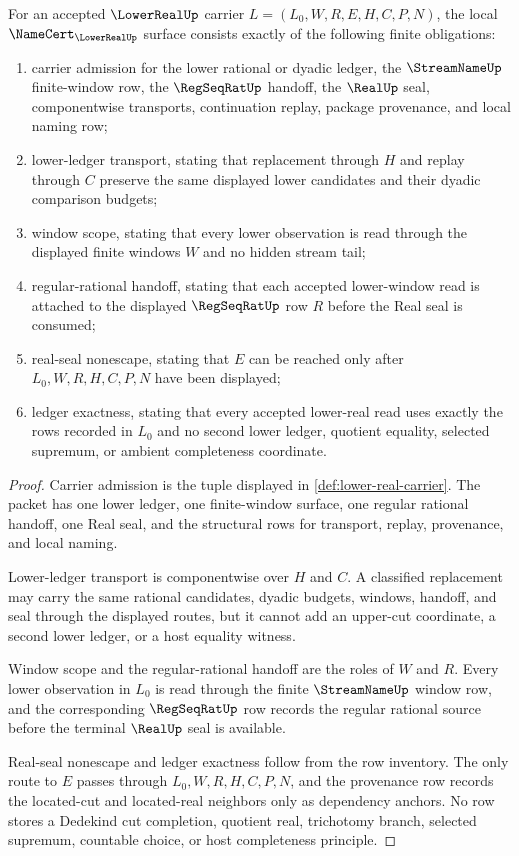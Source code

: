 \begin{theorem}
\label{thm:lower-real-namecert-obligations}
For an accepted $\LowerRealUp$ carrier $L=(L_0,W,R,E,H,C,P,N)$, the local $\NameCert_{\LowerRealUp}$ surface consists exactly of the following finite obligations:
\begin{enumerate}
\item carrier admission for the lower rational or dyadic ledger, the $\StreamNameUp$ finite-window row, the $\RegSeqRatUp$ handoff, the $\RealUp$ seal, componentwise transports, continuation replay, package provenance, and local naming row;
\item lower-ledger transport, stating that replacement through $H$ and replay through $C$ preserve the same displayed lower candidates and their dyadic comparison budgets;
\item window scope, stating that every lower observation is read through the displayed finite windows $W$ and no hidden stream tail;
\item regular-rational handoff, stating that each accepted lower-window read is attached to the displayed $\RegSeqRatUp$ row $R$ before the Real seal is consumed;
\item real-seal nonescape, stating that $E$ can be reached only after $L_0,W,R,H,C,P,N$ have been displayed;
\item ledger exactness, stating that every accepted lower-real read uses exactly the rows recorded in $L_0$ and no second lower ledger, quotient equality, selected supremum, or ambient completeness coordinate.
\end{enumerate}
\end{theorem}
\begin{proof}
Carrier admission is the tuple displayed in \autoref{def:lower-real-carrier}. The packet has one lower ledger, one finite-window surface, one regular rational handoff, one Real seal, and the structural rows for transport, replay, provenance, and local naming.

Lower-ledger transport is componentwise over $H$ and $C$. A classified replacement may carry the same rational candidates, dyadic budgets, windows, handoff, and seal through the displayed routes, but it cannot add an upper-cut coordinate, a second lower ledger, or a host equality witness.

Window scope and the regular-rational handoff are the roles of $W$ and $R$. Every lower observation in $L_0$ is read through the finite $\StreamNameUp$ window row, and the corresponding $\RegSeqRatUp$ row records the regular rational source before the terminal $\RealUp$ seal is available.

Real-seal nonescape and ledger exactness follow from the row inventory. The only route to $E$ passes through $L_0,W,R,H,C,P,N$, and the provenance row records the located-cut and located-real neighbors only as dependency anchors. No row stores a Dedekind cut completion, quotient real, trichotomy branch, selected supremum, countable choice, or host completeness principle.
\end{proof}

